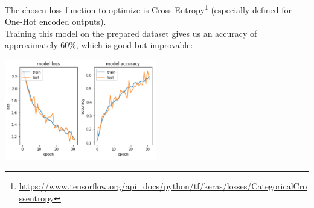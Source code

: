 The chosen loss function to optimize is Cross Entropy\footnote{\href{https://www.tensorflow.org/api\_docs/python/tf/keras/losses/CategoricalCrossentropy}{https://www.tensorflow.org/api\_docs/python/tf/keras/losses/CategoricalCrossentropy}}
(especially defined for One-Hot encoded outputs).\\
Training this model on the prepared dataset gives us an accuracy of approximately 60\%, which is good but improvable:
\begin{center}
    \captionsetup{type=figure}
    \includegraphics[width=250px]{sections/exp-1/images/model-1-acc.png}
\end{center}
